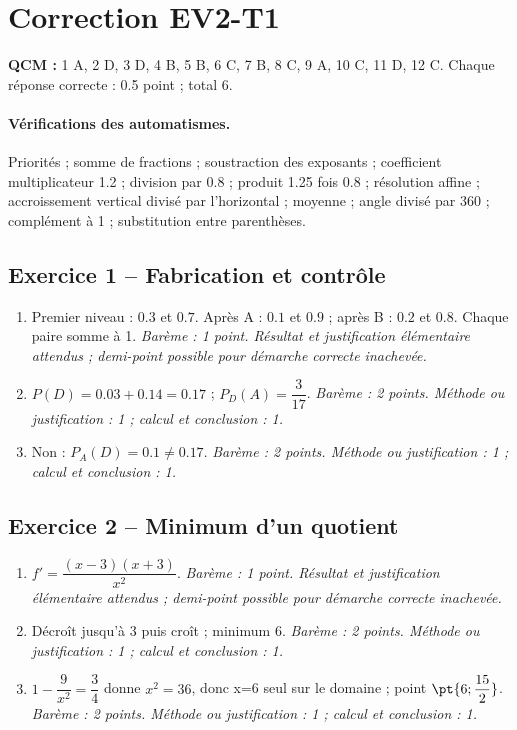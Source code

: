 \mxnewpage\section*{Correction EV2-T1}\label{EV2-T1-CORR}
\textbf{QCM :} 1 A, 2 D, 3 D, 4 B, 5 B, 6 C, 7 B, 8 C, 9 A, 10 C, 11 D, 12 C. Chaque réponse correcte : \num{0,5} point ; total 6.
\paragraph{Vérifications des automatismes.} Priorités ; somme de fractions ; soustraction des exposants ; coefficient multiplicateur \num{1,2} ; division par \num{0,8} ; produit \num{1,25} fois \num{0,8} ; résolution affine ; accroissement vertical divisé par l’horizontal ; moyenne ; angle divisé par 360 ; complément à 1 ; substitution entre parenthèses.
\subsection*{Exercice 1 -- Fabrication et contrôle}
\begin{enumerate}
\item Premier niveau : $\num{0,3}$ et $\num{0,7}$. Après A : $\num{0,1}$ et $\num{0,9}$ ; après B : $\num{0,2}$ et $\num{0,8}$. Chaque paire somme à 1. \textit{Barème : 1 point. Résultat et justification élémentaire attendus ; demi-point possible pour démarche correcte inachevée.}
\item $P(D)=\num{0,03}+\num{0,14}=\num{0,17}$ ; $P_D(A)=\dfrac{3}{17}$. \textit{Barème : 2 points. Méthode ou justification : 1 ; calcul et conclusion : 1.}
\item Non : $P_A(D)=\num{0,1}\ne\num{0,17}$. \textit{Barème : 2 points. Méthode ou justification : 1 ; calcul et conclusion : 1.}
\end{enumerate}
\subsection*{Exercice 2 -- Minimum d’un quotient}
\begin{enumerate}
\item $f\prime =\dfrac{(x-3)(x+3)}{x^2}$. \textit{Barème : 1 point. Résultat et justification élémentaire attendus ; demi-point possible pour démarche correcte inachevée.}
\item Décroît jusqu’à 3 puis croît ; minimum 6. \textit{Barème : 2 points. Méthode ou justification : 1 ; calcul et conclusion : 1.}
\item $1-\dfrac{9}{x^2}=\dfrac{3}{4}$ donne $x^2=36$, donc x=6 seul sur le domaine ; point $\pt{6;\dfrac{15}{2}}$. \textit{Barème : 2 points. Méthode ou justification : 1 ; calcul et conclusion : 1.}
\end{enumerate}
